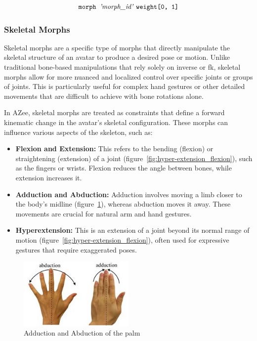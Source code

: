 \documentclass[../../main.tex]{subfiles}
\begin{document}
{\[
\texttt{morph } \text{\emph{'morph\_id'}} \ \texttt{weight[0, 1]}
\]

\subsubsection{Skeletal Morphs}
\label{ch:avatar_creation_pose_synthesis:proc_rig_signing_avatars:morph_constraints:skel_morphs}

Skeletal morphs are a specific type of morphs that directly manipulate the skeletal structure of an avatar to produce a desired pose or motion. Unlike traditional bone-based manipulations that rely solely on inverse or \gls{fk}, skeletal morphs allow for more nuanced and localized control over specific joints or groups of joints. This is particularly useful for complex hand gestures or other detailed movements that are difficult to achieve with bone rotations alone.

In AZee, skeletal morphs are treated as constraints that define a forward kinematic change in the avatar's skeletal configuration. These morphs can influence various aspects of the skeleton, such as:

\begin{itemize}
    \item \textbf{Flexion and Extension:} This refers to the bending (flexion) or straightening (extension) of a joint (figure~\ref{fig:hyper-extension_flexion}), such as the fingers or wrists. Flexion reduces the angle between bones, while extension increases it.
    \item \textbf{Adduction and Abduction:} Adduction involves moving a limb closer to the body's midline (figure~\ref{fig:adduction_abduction}), whereas abduction moves it away. These movements are crucial for natural arm and hand gestures.
    \item \textbf{Hyperextension:} This is an extension of a joint beyond its normal range of motion (figure~\ref{fig:hyper-extension_flexion}), often used for expressive gestures that require exaggerated poses.
\end{itemize}

\begin{figure}
    \centering
    \includegraphics[width=0.5\textwidth]{chapters/avatar_creation_pose_synthesis/images/adduction_abduction.jpg}
    \caption{Adduction and Abduction of the palm}
    \label{fig:adduction_abduction}
\end{figure}

}
\end{document}
